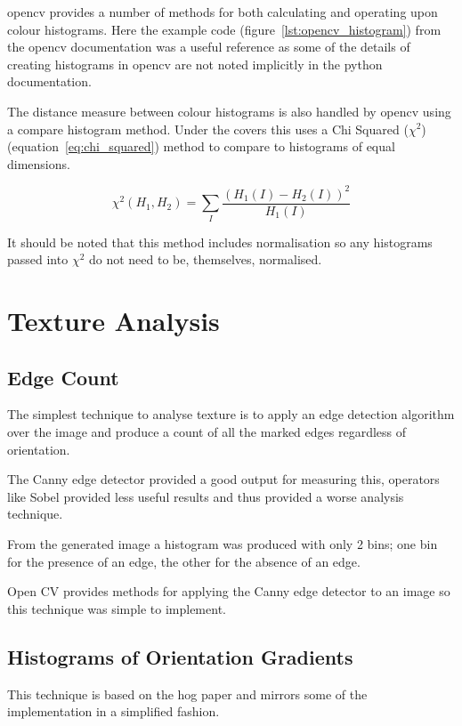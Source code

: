 \gls{opencv} provides a number of methods for both calculating and operating upon colour histograms. 
Here the example code (figure~\ref{lst:opencv_histogram}) from the \gls{opencv} documentation was a
useful reference as some of the details of creating histograms in \gls{opencv} are not noted implicitly
in the python documentation.

The distance measure between colour histograms is also handled by \gls{opencv} using a compare histogram
method. Under the covers this uses a Chi Squared ($\chi^2$) (equation~\ref{eq:chi_squared}) method to
compare to histograms of equal dimensions.

\begin{equation}\label{eq:chi_squared}
\chi^2(H_1,H_2) =\sum_I{\frac{(H_1(I) - H_2(I))^2}{H_1(I)}}
\end{equation}

It should be noted that this method includes normalisation so any histograms passed into $\chi^2$
do not need to be, themselves, normalised.


\section{Texture Analysis}

\subsection{Edge Count}
The simplest technique to analyse texture is to apply an edge detection algorithm over the image
and produce a count of all the marked edges regardless of orientation.

The Canny edge detector\cite{Canny1986Computational} provided a good output for measuring this, 
operators like Sobel provided less useful results and thus provided a worse analysis technique.

From the generated image a histogram was produced with only 2 bins; one bin for the presence of an
edge, the other for the absence of an edge.

Open CV provides methods for applying the Canny edge detector to an image so this technique was 
simple to implement.


\subsection{Histograms of Orientation Gradients}
This technique is based on the \gls{hog} paper\cite{Dalal2005Histograms} and mirrors some of the
implementation in a simplified fashion.

